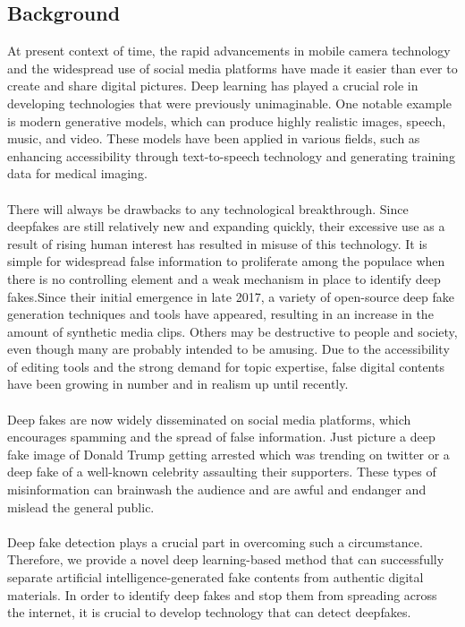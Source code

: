 






\newpage


\newpage


\tableofcontents
\thispagestyle{empty}
\newpage
\listoffigures
\newpage



\newpage



\subsection{Background}
At present context of time, the rapid advancements in mobile camera technology and the widespread use of social media platforms have made it easier than ever to create and share digital pictures. Deep learning has played a crucial role in developing technologies that were previously unimaginable. One notable example is modern generative models, which can produce highly realistic images, speech, music, and video. These models have been applied in various fields, such as enhancing accessibility through text-to-speech technology and generating training data for medical imaging.
\\
\\
There will always be drawbacks to any technological breakthrough. Since deepfakes are still relatively new and expanding quickly, their excessive use as a result of rising human interest has resulted in misuse of this technology. It is simple for widespread false information to proliferate among the populace when there is no controlling element and a weak mechanism in place to identify deep fakes.Since their initial emergence in late 2017, a variety of open-source deep fake generation techniques and tools have appeared, resulting in an increase in the amount of synthetic media clips. Others may be destructive to people and society, even though many are probably intended to be amusing. Due to the accessibility of editing tools and the strong demand for topic expertise, false digital contents have been growing in number and in realism up until recently.
\\
\\
Deep fakes are now widely disseminated on social media platforms, which encourages spamming and the spread of false information. Just picture a deep fake image of Donald Trump getting arrested which was trending on twitter or a deep fake of a well-known celebrity assaulting their supporters.
These types of misinformation can brainwash the audience and are awful and endanger and mislead the general public.
\\
\\
Deep fake detection plays a crucial part in overcoming such a circumstance. Therefore, we provide a novel deep learning-based method that can successfully separate artificial intelligence-generated fake contents from authentic digital materials. In order to identify deep fakes and stop them from spreading across the internet, it is crucial to develop technology that can detect deepfakes.

